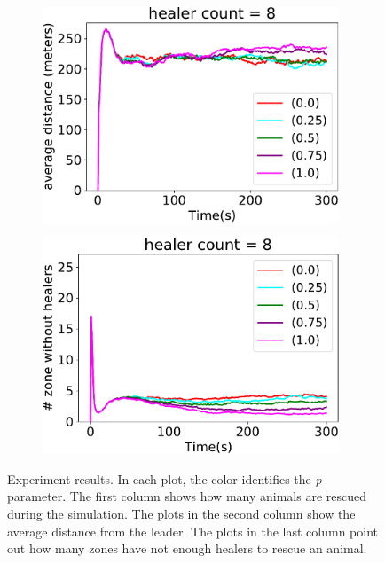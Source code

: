 \documentclass[jsan,article,accept,moreauthors,pdftex]{Definitions/mdpi}
\begin{document}
\begin{figure}[H]
\begin{subfigure}[b]{0.32\textwidth}
\includegraphics[width=0.97\textwidth]{imgs/avg-distance-from-leader-8.pdf}
\end{subfigure}
\hfill
%
\begin{subfigure}[b]{0.32\textwidth}
\centering
\includegraphics[width=0.97\textwidth]{imgs/empty-zone-8.pdf}
\end{subfigure}
\par\bigskip %
%
\caption{Experiment results. In each plot, the color identifies the \emph{p} parameter. 
The first column shows how many animals are rescued during the simulation.
The plots in the second column show the average distance from the leader.
The plots in the last column point out how many zones have not enough healers to rescue an animal.} %
\label{fig:wildlife-simulation}
\end{figure}
\end{document}
